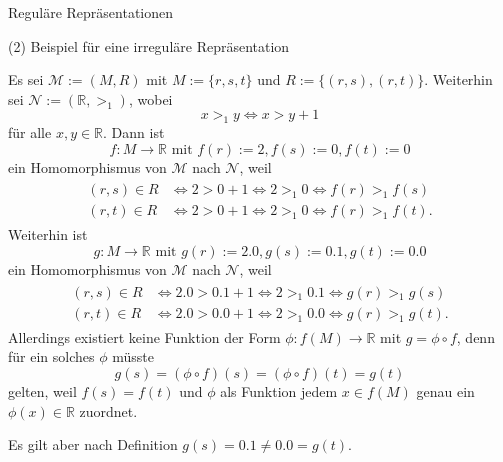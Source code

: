 \documentclass[
  8pt,
  ignorenonframetext,
]{beamer}
\begin{document}
\begin{frame}{Reguläre Repräsentationen}
\protect\hypertarget{reguluxe4re-repruxe4sentationen-4}{}
\small
\vspace{1mm}

\noindent (2) Beispiel für eine irreguläre Repräsentation \footnotesize

Es sei \(\mathcal{M} := (M,R)\) mit \(M := \{r,s,t\}\) und
\(R := \{(r,s),(r,t)\}\). Weiterhin sei
\(\mathcal{N} := (\mathbb{R},>_{1})\), wobei \begin{equation}
x >_{1} y \Leftrightarrow x > y + 1
\end{equation} für alle \(x,y\in \mathbb{R}\). Dann ist \begin{equation}
f : M \to \mathbb{R} \mbox{ mit } f(r) := 2, f(s) := 0, f(t) := 0
\end{equation} ein Homomorphismus von \(\mathcal{M}\) nach
\(\mathcal{N}\), weil \begin{align}
\begin{split}
(r,s) \in R & \Leftrightarrow 2 > 0 + 1 \Leftrightarrow 2 >_1 0 \Leftrightarrow f(r) >_{1} f(s) \\
(r,t) \in R & \Leftrightarrow 2 > 0 + 1 \Leftrightarrow 2 >_1 0 \Leftrightarrow f(r) >_{1} f(t).
\end{split}
\end{align} Weiterhin ist \begin{equation}
g : M \to \mathbb{R} \mbox{ mit } g(r) := 2.0, g(s) := 0.1, g(t) := 0.0
\end{equation} ein Homomorphismus von \(\mathcal{M}\) nach
\(\mathcal{N}\), weil \begin{align}
\begin{split}
(r,s) \in R & \Leftrightarrow 2.0 > 0.1 + 1 \Leftrightarrow 2 >_1 0.1 \Leftrightarrow g(r) >_{1} g(s) \\
(r,t) \in R & \Leftrightarrow 2.0 > 0.0 + 1 \Leftrightarrow 2 >_1 0.0 \Leftrightarrow g(r) >_{1} g(t).
\end{split}
\end{align} Allerdings existiert keine Funktion der Form
\(\phi:f(M) \to \mathbb{R}\) mit \(g = \phi \circ f\), denn für ein
solches \(\phi\) müsste \begin{equation}
g(s) = (\phi \circ f)(s) = (\phi \circ f)(t) = g(t)
\end{equation} gelten, weil \(f(s) = f(t)\) und \(\phi\) als Funktion
jedem \(x \in f(M)\) genau ein \(\phi(x) \in \mathbb{R}\) zuordnet.

Es gilt aber nach Definition \(g(s) = 0.1 \neq 0.0 = g(t)\).
\end{frame}
\end{document}
